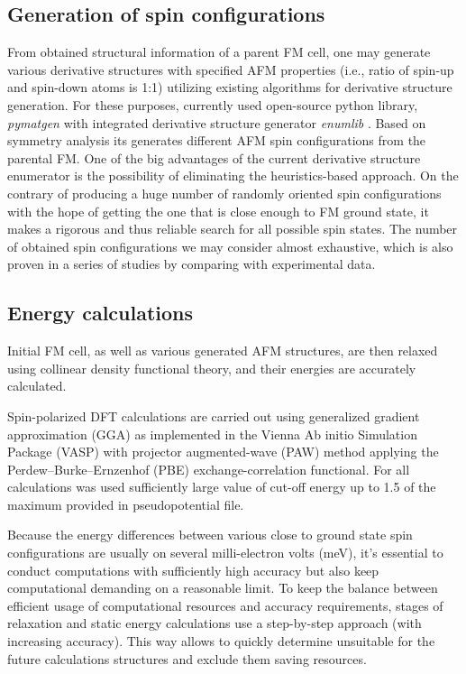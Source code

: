 \subsection{Generation of spin configurations}
From obtained structural information of a parent FM cell, one may generate various derivative structures with specified AFM properties (i.e., ratio of spin-up and spin-down atoms is 1:1) utilizing existing algorithms for derivative structure generation. 
For these purposes, currently used open-source python library, \textit{pymatgen} \cite{Ong:2013vd} with integrated derivative structure generator \textit{enumlib} \cite{enum_1, enum_2, enum_3, enum_4}. Based on symmetry analysis its generates different AFM spin configurations from the parental FM. One of the big advantages of the current derivative structure enumerator is the possibility of eliminating the heuristics-based approach. On the contrary of producing a huge number of randomly oriented spin configurations with the hope of getting the one that is close enough to FM ground state, it makes a rigorous and thus reliable search for all possible spin states. The number of obtained spin configurations we may consider almost exhaustive, which is also proven in a series of studies by comparing with experimental data. 

\subsection{Energy calculations}

Initial FM cell, as well as various generated AFM structures, are then relaxed using collinear density functional theory,  and their energies are accurately calculated.  

Spin-polarized DFT calculations are carried out using generalized gradient approximation (GGA) as implemented in the Vienna Ab initio Simulation Package (VASP) \cite{Kresse_1996} with projector augmented-wave (PAW) \cite{Kresse_1999} method applying the Perdew–Burke–Ernzenhof (PBE) \cite{Perdew_1996} exchange-correlation functional. For all calculations was used sufficiently large value of cut-off energy up to 1.5 of the maximum provided in pseudopotential file.

Because the energy differences between various close to ground state spin configurations are usually on several milli-electron volts (meV), it's essential to conduct computations with sufficiently high accuracy but also keep computational demanding on a reasonable limit. To keep the balance between efficient usage of computational resources and accuracy requirements, stages of relaxation and static energy calculations use a step-by-step approach (with increasing accuracy). This way allows to quickly determine unsuitable for the future calculations structures and exclude them saving resources.

